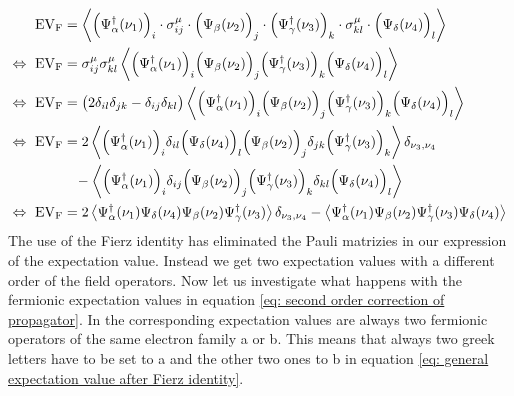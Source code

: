 %
\begin{align}
	\mt{EV}_{\mt{F}} &= \expval{\Big(\Psi_{\alpha}^{\dag}(\nu_{1})\Big)_{i} \cdot \sigma_{ij}^{\mu} \cdot \Big(\Psi_{\beta}(\nu_{2})\Big)_{j} \cdot \Big(\Psi_{\gamma}^{\dag}(\nu_{3})\Big)_{k} \cdot \sigma_{kl}^{\mu} \cdot \Big(\Psi_{\delta}(\nu_{4})\Big)_{l}}
	\notag \\ 
	\Leftrightarrow\ \mt{EV}_{\mt{F}} &= \sigma_{ij}^{\mu} \sigma_{kl}^{\mu} \expval{\Big(\Psi_{\alpha}^{\dag}(\nu_{1})\Big)_{i} \Big(\Psi_{\beta}(\nu_{2})\Big)_{j} \Big(\Psi_{\gamma}^{\dag}(\nu_{3})\Big)_{k} \Big(\Psi_{\delta}(\nu_{4})\Big)_{l}}
	\notag \\ 
	\Leftrightarrow\ \mt{EV}_{\mt{F}} &= \big(2 \delta_{il} \delta_{jk} - \delta_{ij} \delta_{kl}\big) \expval{\Big(\Psi_{\alpha}^{\dag}(\nu_{1})\Big)_{i} \Big(\Psi_{\beta}(\nu_{2})\Big)_{j} \Big(\Psi_{\gamma}^{\dag}(\nu_{3})\Big)_{k} \Big(\Psi_{\delta}(\nu_{4})\Big)_{l}}
	\notag \\ 
	\Leftrightarrow\ \mt{EV}_{\mt{F}} &= 
		2 \expval{
			\Big(\Psi_{\alpha}^{\dag}(\nu_{1})\Big)_{i} 
			\delta_{il} 
			\Big(\Psi_{\delta}(\nu_{4})\Big)_{l} 
			\Big(\Psi_{\beta}(\nu_{2})\Big)_{j} 
			\delta_{jk}
			\Big(\Psi_{\gamma}^{\dag}(\nu_{3})\Big)_{k}
		}
		\delta_{\nu_{3},\nu_{4}}
		\notag \\ &\,\,\enspace -
		\expval{
			\Big(\Psi_{\alpha}^{\dag}(\nu_{1})\Big)_{i} 
			\delta_{ij}
			\Big(\Psi_{\beta}(\nu_{2})\Big)_{j} 
			\Big(\Psi_{\gamma}^{\dag}(\nu_{3})\Big)_{k} 
			\delta_{kl}
			\Big(\Psi_{\delta}(\nu_{4})\Big)_{l}
		}
		\notag \\ 
	\Leftrightarrow\ \mt{EV}_{\mt{F}} &= 
		2 \expval{
			\Psi_{\alpha}^{\dag}(\nu_{1}) 
			\Psi_{\delta}(\nu_{4})
			\Psi_{\beta}(\nu_{2})
			\Psi_{\gamma}^{\dag}(\nu_{3})
		}
		\delta_{\nu_{3},\nu_{4}}
		-
		\expval{
			\Psi_{\alpha}^{\dag}(\nu_{1})
			\Psi_{\beta}(\nu_{2})
			\Psi_{\gamma}^{\dag}(\nu_{3})
			\Psi_{\delta}(\nu_{4})
		}
	\label{eq: general expectation value after Fierz identity}
\end{align}
%
The use of the Fierz identity has eliminated the Pauli matrizies in our expression of the expectation value.
Instead we get two expectation values with a different order of the field operators.
Now let us investigate what happens with the fermionic expectation values in equation \eqref{eq: second order correction of propagator}.
In the corresponding expectation values are always two fermionic operators of the same electron family a or b.
This means that always two greek letters have to be set to a and the other two ones to b in equation \eqref{eq: general expectation value after Fierz identity}.
